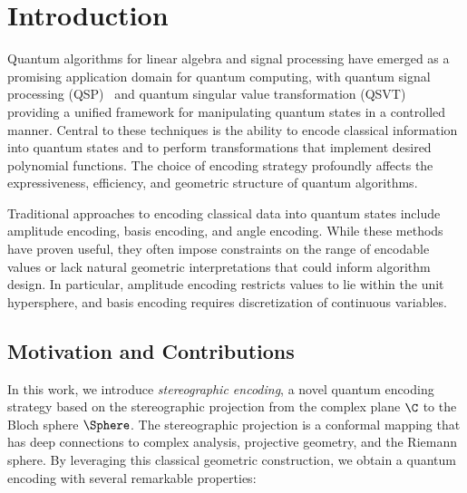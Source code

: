 \section{Introduction}
\label{sec:introduction}

Quantum algorithms for linear algebra and signal processing have emerged as a promising application domain for quantum computing, with quantum signal processing (QSP)~\cite{GSLW2019} and quantum singular value transformation (QSVT)~\cite{GSLW2019} providing a unified framework for manipulating quantum states in a controlled manner. Central to these techniques is the ability to encode classical information into quantum states and to perform transformations that implement desired polynomial functions. The choice of encoding strategy profoundly affects the expressiveness, efficiency, and geometric structure of quantum algorithms.

Traditional approaches to encoding classical data into quantum states include amplitude encoding, basis encoding, and angle encoding. While these methods have proven useful, they often impose constraints on the range of encodable values or lack natural geometric interpretations that could inform algorithm design. In particular, amplitude encoding restricts values to lie within the unit hypersphere, and basis encoding requires discretization of continuous variables.

\subsection{Motivation and Contributions}

In this work, we introduce \emph{stereographic encoding}, a novel quantum encoding strategy based on the stereographic projection from the complex plane $\C$ to the Bloch sphere $\Sphere$. The stereographic projection is a conformal mapping that has deep connections to complex analysis, projective geometry, and the Riemann sphere. By leveraging this classical geometric construction, we obtain a quantum encoding with several remarkable properties:

